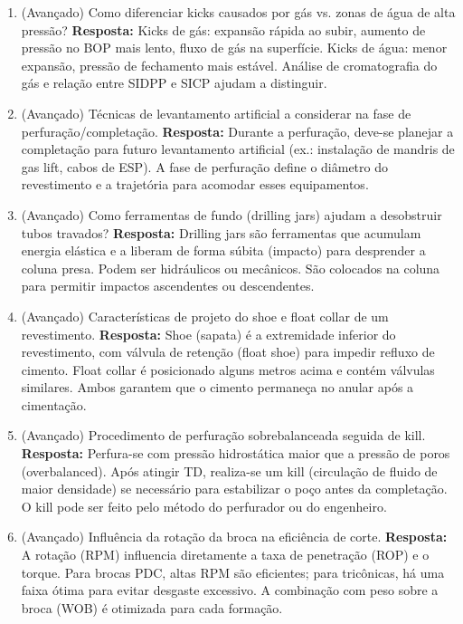 \documentclass[11pt,a4paper]{article}
\begin{document}
\begin{enumerate}
  \item (Avançado) Como diferenciar kicks causados por gás vs. zonas de água de alta pressão?
  \textbf{Resposta:} Kicks de gás: expansão rápida ao subir, aumento de pressão no BOP mais lento, fluxo de gás na superfície. Kicks de água: menor expansão, pressão de fechamento mais estável. Análise de cromatografia do gás e relação entre SIDPP e SICP ajudam a distinguir.

  \item (Avançado) Técnicas de levantamento artificial a considerar na fase de perfuração/completação.
  \textbf{Resposta:} Durante a perfuração, deve-se planejar a completação para futuro levantamento artificial (ex.: instalação de mandris de gas lift, cabos de ESP). A fase de perfuração define o diâmetro do revestimento e a trajetória para acomodar esses equipamentos.

  \item (Avançado) Como ferramentas de fundo (drilling jars) ajudam a desobstruir tubos travados?
  \textbf{Resposta:} Drilling jars são ferramentas que acumulam energia elástica e a liberam de forma súbita (impacto) para desprender a coluna presa. Podem ser hidráulicos ou mecânicos. São colocados na coluna para permitir impactos ascendentes ou descendentes.

  \item (Avançado) Características de projeto do shoe e float collar de um revestimento.
  \textbf{Resposta:} Shoe (sapata) é a extremidade inferior do revestimento, com válvula de retenção (float shoe) para impedir refluxo de cimento. Float collar é posicionado alguns metros acima e contém válvulas similares. Ambos garantem que o cimento permaneça no anular após a cimentação.

  \item (Avançado) Procedimento de perfuração sobrebalanceada seguida de kill.
  \textbf{Resposta:} Perfura-se com pressão hidrostática maior que a pressão de poros (overbalanced). Após atingir TD, realiza-se um kill (circulação de fluido de maior densidade) se necessário para estabilizar o poço antes da completação. O kill pode ser feito pelo método do perfurador ou do engenheiro.

  \item (Avançado) Influência da rotação da broca na eficiência de corte.
  \textbf{Resposta:} A rotação (RPM) influencia diretamente a taxa de penetração (ROP) e o torque. Para brocas PDC, altas RPM são eficientes; para tricônicas, há uma faixa ótima para evitar desgaste excessivo. A combinação com peso sobre a broca (WOB) é otimizada para cada formação.


\end{enumerate}
\end{document}
